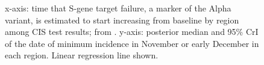\documentclass[thesis.tex]{subfiles}
\begin{document}
\begin{figure}
    \caption[Correlation of the emergence of Alpha and minimum incidence.]{%
        x-axis: time that S-gene target failure, a marker of the Alpha variant, is estimated to start increasing from baseline by region among CIS test results; from \textcite[table S3]{walkerTracking}.
        y-axis: posterior median and 95\% CrI of the date of minimum incidence in November or early December in each region.
        Linear regression line shown.
    }
    \label{transmission:fig:backcalc-alpha}
\end{figure}
\end{document}
